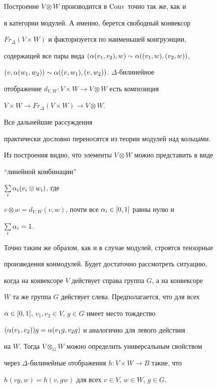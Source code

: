 \begin{pf}


Построение $V\otimes W$ производится в $\operatorname{Conv}$ точно так же, как и


в категории модулей. А именно, берется свободный конвексор


$Fr_{\Delta}(V\times W)$ и факторизуется по наименьшей конгруэнции,


содержащей все пары вида $(\alpha(v_1,v_2), w)\sim \alpha((v_1,w),(v_2,w))$,


$(v,\alpha(w_1,w_2))\sim \alpha((v,w_1),(v,w_2))$.\; $\Delta$-билинейное


отображение $d_{V,W}:V\times W\to V\otimes W$ есть композиция


$V\times W\to Fr_{\Delta}(V\times W)\to V\otimes W$.


Все дальнейшие рассуждения


практически дословно переносятся из теории модулей над кольцами.


\end{pf}





Из построения видно, что элементы $V\otimes W$ можно представить в виде


``линейной комбинации''


$\sum\limits_i \alpha_i (v_i\otimes w_i)$, где


$v\otimes w=d_{V,W}(v,w)$, почти все $\alpha_i\in[0,1]$ равны нулю и


$\sum\limits_i \alpha_i=1$.





Точно таким же образом, как и в случае модулей, строятся тензорные


произведения конмодулей. Будет достаточно рассмотреть ситуацию,


когда на конвексоре $V$ действует справа группа $G$, а на конвексоре


$W$ та же группа $G$ действует слева. Предполагается, что для всех


$\alpha\in [0,1]$, $v_1,v_2\in V$, $g\in G$ имеет место тождество


$(\alpha(v_1,v_2))g=\alpha(v_1 g,v_2 g)$ и аналогично для левого действия


на $W$. Тогда $V\otimes_G W$ можно определить универсальным свойством


через $\Delta$-билинейные отображения $h: V\times W\to B$ такие, что


$h(v g,w)=h(v, g w)$ для всех $v\in V$, $w\in W$, $g\in G$.


